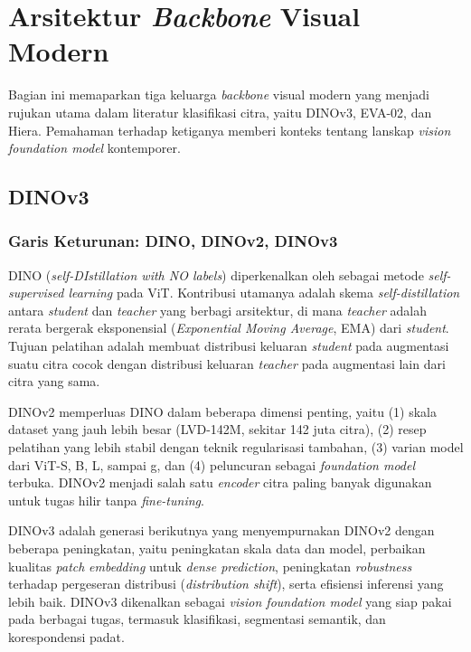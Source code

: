 \section{Arsitektur \textit{Backbone} Visual Modern}
\label{sec:backbone}

Bagian ini memaparkan tiga keluarga \textit{backbone} visual modern yang menjadi rujukan utama dalam literatur klasifikasi citra, yaitu DINOv3, EVA-02, dan Hiera. Pemahaman terhadap ketiganya memberi konteks tentang lanskap \textit{vision foundation model} kontemporer.

\subsection{DINOv3}
\label{sec:dinov3}

\subsubsection{Garis Keturunan: DINO, DINOv2, DINOv3}

DINO (\textit{self-DIstillation with NO labels}) diperkenalkan oleh \citet{caronDINO2021} sebagai metode \textit{self-supervised learning} pada ViT. Kontribusi utamanya adalah skema \textit{self-distillation} antara \textit{student} dan \textit{teacher} yang berbagi arsitektur, di mana \textit{teacher} adalah rerata bergerak eksponensial (\textit{Exponential Moving Average}, EMA) dari \textit{student}. Tujuan pelatihan adalah membuat distribusi keluaran \textit{student} pada augmentasi suatu citra cocok dengan distribusi keluaran \textit{teacher} pada augmentasi lain dari citra yang sama.

DINOv2 \citep{oquabDINOv22024} memperluas DINO dalam beberapa dimensi penting, yaitu (1) skala dataset yang jauh lebih besar (LVD-142M, sekitar 142 juta citra), (2) resep pelatihan yang lebih stabil dengan teknik regularisasi tambahan, (3) varian model dari ViT-S, B, L, sampai g, dan (4) peluncuran sebagai \textit{foundation model} terbuka. DINOv2 menjadi salah satu \textit{encoder} citra paling banyak digunakan untuk tugas hilir tanpa \textit{fine-tuning}.

DINOv3 \citep{simeoniDINOv32025} adalah generasi berikutnya yang menyempurnakan DINOv2 dengan beberapa peningkatan, yaitu peningkatan skala data dan model, perbaikan kualitas \textit{patch} \textit{embedding} untuk \textit{dense prediction}, peningkatan \textit{robustness} terhadap pergeseran distribusi (\textit{distribution shift}), serta efisiensi inferensi yang lebih baik. DINOv3 dikenalkan sebagai \textit{vision foundation model} yang siap pakai pada berbagai tugas, termasuk klasifikasi, segmentasi semantik, dan korespondensi padat.

